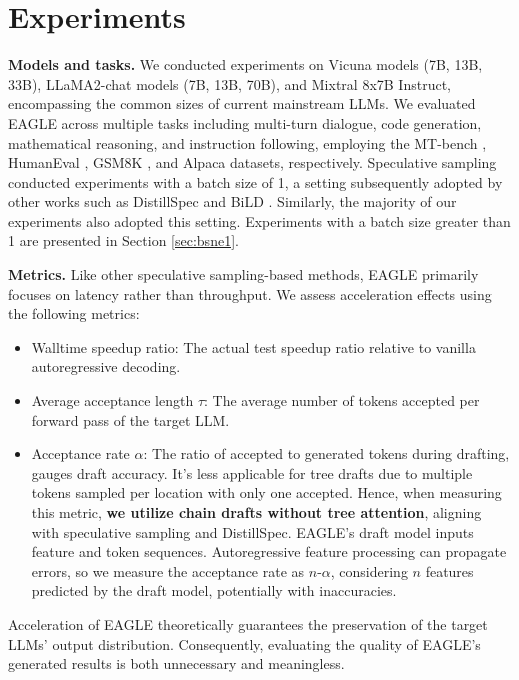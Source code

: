\documentclass{article}
\theoremstyle{plain}
\theoremstyle{definition}
\theoremstyle{remark}
\begin{document}
\label{me:ver}



\section{Experiments}


\textbf{Models and tasks.} We conducted experiments on Vicuna models (7B, 13B, 33B), LLaMA2-chat models (7B, 13B, 70B), and Mixtral 8x7B Instruct, encompassing the common sizes of current mainstream LLMs.
We evaluated EAGLE across multiple tasks including multi-turn dialogue, code generation, mathematical reasoning, and instruction following, employing the MT-bench \cite{zheng2023judging}, HumanEval \cite{chen2021evaluating}, GSM8K \cite{cobbe2021training}, and Alpaca \cite{alpaca} datasets, respectively.
Speculative sampling \cite{leviathan2023fast} conducted experiments with a batch size of 1, a setting subsequently adopted by other works such as DistillSpec \cite{zhou2023distillspec} and BiLD \cite{kim2023speculative}. Similarly, the majority of our experiments also adopted this setting. Experiments with a batch size greater than 1 are presented in Section \ref{sec:bsne1}.

\textbf{Metrics.}
Like other speculative sampling-based methods, EAGLE primarily focuses on latency rather than throughput. We assess acceleration effects using the following metrics:
\begin{itemize}
    \item Walltime speedup ratio: The actual test speedup ratio relative to vanilla autoregressive decoding.
    \item Average acceptance length $\tau$: The average number of tokens accepted per forward pass of the target LLM.
    \item Acceptance rate $\alpha$: The ratio of accepted to generated tokens during drafting, gauges draft accuracy. It's less applicable for tree drafts due to multiple tokens sampled per location with only one accepted. Hence, when measuring this metric, \textbf{we utilize chain drafts without tree attention}, aligning with speculative sampling and DistillSpec. EAGLE's draft model inputs feature and token sequences. Autoregressive feature processing can propagate errors, so we measure the acceptance rate as $n\text{-}\alpha$, considering $n$ features predicted by the draft model, potentially with inaccuracies.
\end{itemize}

Acceleration of EAGLE theoretically guarantees the preservation of the target LLMs' output distribution. Consequently, evaluating the quality of EAGLE's generated results is both unnecessary and meaningless.
\end{document}
